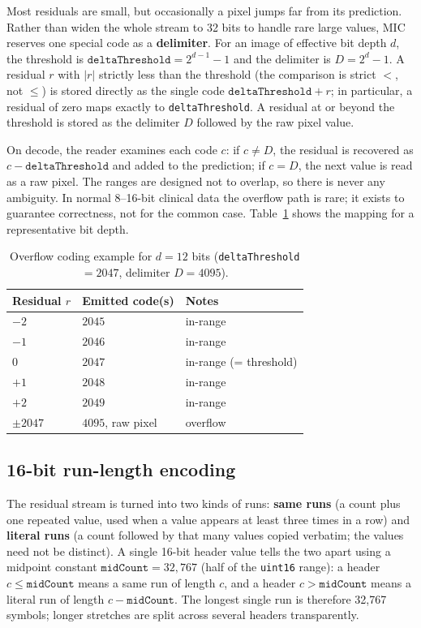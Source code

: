 \documentclass[journal]{IEEEtran}
\begin{document}
Most residuals are small, but occasionally a pixel jumps far from its
prediction. Rather than widen the whole stream to 32 bits to handle rare
large values, MIC reserves one special code as a \textbf{delimiter}. For an
image of effective bit depth $d$, the threshold is
$\texttt{deltaThreshold} = 2^{d-1}-1$ and the delimiter is $D = 2^{d}-1$. A
residual $r$ with $|r|$ strictly less than the threshold (the comparison is
strict $<$, not $\leq$) is stored directly as the single code
$\texttt{deltaThreshold} + r$; in particular, a residual of zero maps exactly
to \texttt{deltaThreshold}. A residual at or beyond the threshold is stored
as the delimiter $D$ followed by the raw pixel value.

On decode, the reader examines each code $c$: if $c \neq D$, the residual is
recovered as $c - \texttt{deltaThreshold}$ and added to the prediction; if
$c = D$, the next value is read as a raw pixel. The ranges are designed not
to overlap, so there is never any ambiguity. In normal 8--16-bit clinical
data the overflow path is rare; it exists to guarantee correctness, not for
the common case. Table~\ref{tab:overflow-map} shows the mapping for a
representative bit depth.

\begin{table}[htbp]
\centering
\caption{Overflow coding example for $d=12$ bits
(\texttt{deltaThreshold}$=2047$, delimiter $D=4095$).}
\label{tab:overflow-map}
\scriptsize
\begin{tabular}{lll}
\toprule
Residual $r$ & Emitted code(s) & Notes \\
\midrule
$-2$ & $2045$ & in-range \\
$-1$ & $2046$ & in-range \\
$0$  & $2047$ & in-range (= threshold) \\
$+1$ & $2048$ & in-range \\
$+2$ & $2049$ & in-range \\
$\pm 2047$ & $4095$, raw pixel & overflow \\
\bottomrule
\end{tabular}
\end{table}

\subsection{16-bit run-length encoding}
\label{sec:rle}

The residual stream is turned into two kinds of runs: \textbf{same runs} (a
count plus one repeated value, used when a value appears at least three times
in a row) and \textbf{literal runs} (a count followed by that many values
copied verbatim; the values need not be distinct). A single 16-bit header
value tells the two apart using a midpoint constant
$\texttt{midCount} = 32{,}767$ (half of the \texttt{uint16} range): a header
$c \leq \texttt{midCount}$ means a same run of length $c$, and a header
$c > \texttt{midCount}$ means a literal run of length $c - \texttt{midCount}$.
The longest single run is therefore 32,767 symbols; longer stretches are
split across several headers transparently.
\end{document}
